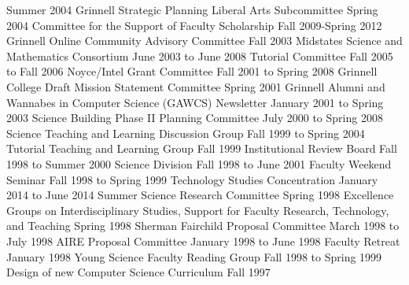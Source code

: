 \begin{cventries}
  {Summer 2004}
  {Grinnell Strategic Planning Liberal Arts Subcommittee}
  {Spring 2004}
  {Committee for the Support of Faculty Scholarship}
  {Fall 2009-Spring 2012}
  {Grinnell Online Community Advisory Committee}
  {Fall 2003}
  {Midstates Science and Mathematics Consortium}
  {June 2003 to June 2008}
  {Tutorial Committee}
  {Fall 2005 to Fall 2006}
  {Noyce/Intel Grant Committee}
  {Fall 2001 to Spring 2008}
  {Grinnell College Draft Mission Statement Committee}
  {Spring 2001}
  {Grinnell Alumni and Wannabes in Computer Science (GAWCS) Newsletter}
  {January 2001 to Spring 2003}
  {Science Building Phase II Planning Committee}
  {July 2000 to Spring 2008}
  {Science Teaching and Learning Discussion Group}
  {Fall 1999 to Spring 2004}
  {Tutorial Teaching and Learning Group}
  {Fall 1999}
  {Institutional Review Board}
  {Fall 1998 to Summer 2000}
  {Science Division}
  {Fall 1998 to June 2001}
  {Faculty Weekend Seminar}
  {Fall 1998 to Spring 1999}
  {Technology Studies Concentration}
  {January 2014 to June 2014}
  {Summer Science Research Committee}
  {Spring 1998}
  {Excellence Groups on Interdisciplinary Studies, Support for Faculty Research, Technology, and Teaching}
  {Spring 1998}
  {Sherman Fairchild Proposal Committee}
  {March 1998 to July 1998}
  {AIRE Proposal Committee}
  {January 1998 to June 1998}
  {Faculty Retreat}
  {January 1998}
  {Young Science Faculty Reading Group}
  {Fall 1998 to Spring 1999}
  {Design of new Computer Science Curriculum}
  {Fall 1997}

\end{cventries}
